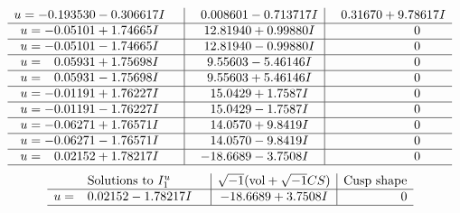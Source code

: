 \documentclass[1p]{elsarticle_modified}
\theoremstyle{definition}
\newcommand{\I}{\sqrt{-1}}
\begin{document}
$$\begin{array}{c|c|c}
\begin{aligned}
u &= -0.193530 - 0.306617 I\end{aligned}
 & \phantom{-}0.008601 - 0.713717 I & \phantom{-}0.31670 + 9.78617 I \\ \hline\begin{aligned}
u &= -0.05101 + 1.74665 I\end{aligned}
 & \phantom{-}12.81940 + 0.99880 I & \phantom{-0.000000 } 0 \\ \hline\begin{aligned}
u &= -0.05101 - 1.74665 I\end{aligned}
 & \phantom{-}12.81940 - 0.99880 I & \phantom{-0.000000 } 0 \\ \hline\begin{aligned}
u &= \phantom{-}0.05931 + 1.75698 I\end{aligned}
 & \phantom{-}9.55603 - 5.46146 I & \phantom{-0.000000 } 0 \\ \hline\begin{aligned}
u &= \phantom{-}0.05931 - 1.75698 I\end{aligned}
 & \phantom{-}9.55603 + 5.46146 I & \phantom{-0.000000 } 0 \\ \hline\begin{aligned}
u &= -0.01191 + 1.76227 I\end{aligned}
 & \phantom{-}15.0429 + 1.7587 I & \phantom{-0.000000 } 0 \\ \hline\begin{aligned}
u &= -0.01191 - 1.76227 I\end{aligned}
 & \phantom{-}15.0429 - 1.7587 I & \phantom{-0.000000 } 0 \\ \hline\begin{aligned}
u &= -0.06271 + 1.76571 I\end{aligned}
 & \phantom{-}14.0570 + 9.8419 I & \phantom{-0.000000 } 0 \\ \hline\begin{aligned}
u &= -0.06271 - 1.76571 I\end{aligned}
 & \phantom{-}14.0570 - 9.8419 I & \phantom{-0.000000 } 0 \\ \hline\begin{aligned}
u &= \phantom{-}0.02152 + 1.78217 I\end{aligned}
 & -18.6689 - 3.7508 I & \phantom{-0.000000 } 0\\
 \hline 
 \end{array}$$\newpage$$\begin{array}{c|c|c}  
\text{Solutions to }I^u_{1}& \I (\text{vol} + \sqrt{-1}CS) & \text{Cusp shape}\\
 \hline 
\begin{aligned}
u &= \phantom{-}0.02152 - 1.78217 I\end{aligned}
 & -18.6689 + 3.7508 I & \phantom{-0.000000 } 0\\
 \hline 
 \end{array}$$\newpage
\end{document}
